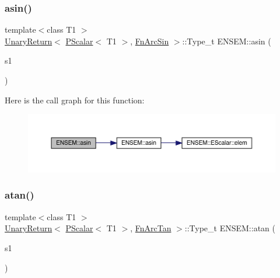 \subsubsection{\texorpdfstring{asin()}{asin()}}
{\footnotesize\ttfamily template$<$class T1 $>$ \\
\mbox{\hyperlink{structENSEM_1_1UnaryReturn}{Unary\+Return}}$<$ \mbox{\hyperlink{classENSEM_1_1PScalar}{P\+Scalar}}$<$ T1 $>$, \mbox{\hyperlink{structENSEM_1_1FnArcSin}{Fn\+Arc\+Sin}} $>$\+::Type\+\_\+t E\+N\+S\+E\+M\+::asin (\begin{DoxyParamCaption}\item[{const \mbox{\hyperlink{classENSEM_1_1PScalar}{P\+Scalar}}$<$ T1 $>$ \&}]{s1 }\end{DoxyParamCaption})\hspace{0.3cm}{\ttfamily [inline]}}

Here is the call graph for this function\+:\nopagebreak
\begin{figure}[H]
\begin{center}
\leavevmode
\includegraphics[width=350pt]{db/dcc/group__primscalar_ga66e19f88731b0ca161e7ecb7a3d4ea94_cgraph}
\end{center}
\end{figure}
\mbox{\label{group__primscalar_gad0db281b26948d9de5a2de123a357fe5}} 
\subsubsection{\texorpdfstring{atan()}{atan()}}
{\footnotesize\ttfamily template$<$class T1 $>$ \\
\mbox{\hyperlink{structENSEM_1_1UnaryReturn}{Unary\+Return}}$<$ \mbox{\hyperlink{classENSEM_1_1PScalar}{P\+Scalar}}$<$ T1 $>$, \mbox{\hyperlink{structENSEM_1_1FnArcTan}{Fn\+Arc\+Tan}} $>$\+::Type\+\_\+t E\+N\+S\+E\+M\+::atan (\begin{DoxyParamCaption}\item[{const \mbox{\hyperlink{classENSEM_1_1PScalar}{P\+Scalar}}$<$ T1 $>$ \&}]{s1 }\end{DoxyParamCaption})\hspace{0.3cm}{\ttfamily [inline]}}


